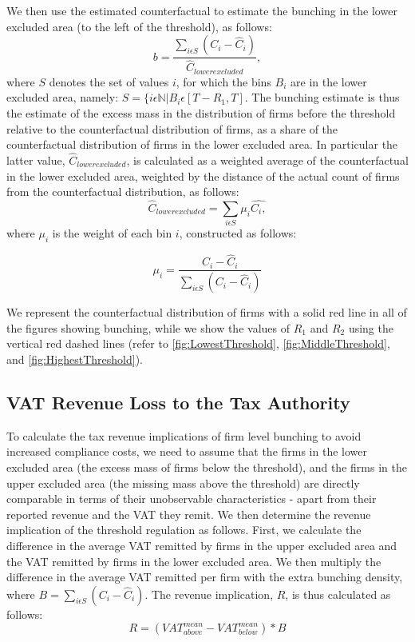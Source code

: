 We then use the estimated counterfactual to estimate the bunching in the lower excluded area (to the left of the threshold), as follows:
\begin{equation}
  \label{eq:bunching}
  b=\frac{\sum_{i\epsilon S}(C_{i}-\hat{C}_{i})}{\hat{C}_{lowerexcluded}},
\end{equation}
where $S$ denotes the set of values $i$, for which the bins $B_{i}$ are in the lower excluded area, namely: $S=\{i\epsilon\mathbb{N}|B_{i}\epsilon[T-R_{1},T]$. The bunching estimate is thus the estimate of the excess mass in the distribution of firms before the threshold relative to the counterfactual distribution of firms, as a share of the counterfactual distribution of firms in the lower excluded area. In particular the latter value, $\hat{C}_{lowerexcluded}$, is calculated as a weighted average of the counterfactual in the lower excluded area, weighted by the distance of the actual count of firms from the counterfactual distribution, as follows: 
\begin{equation}
  \label{eq:lowerexcluded}
  \hat{C}_{lowerexcluded}=\sum_{i\epsilon S}\mu_{i}\hat{C_{i},}
\end{equation}
where $\mu_{i}$ is the weight of each bin $i$, constructed as follows:

\begin{equation}
  \label{eq:weight}
  \mu_{i}=\frac{C_{i}-\hat{C}_{i}}{\sum_{i\epsilon S}(C_{i}-\hat{C}_{i})}
\end{equation}

We represent the counterfactual distribution of firms with a solid red line in all of the figures showing bunching, while we show the
values of $R_{1}$ and $R_{2}$ using the vertical red dashed lines (refer to \cref{fig:LowestThreshold}, \cref{fig:MiddleThreshold}, and \cref{fig:HighestThreshold}).

\subsection{VAT Revenue Loss to the Tax Authority}
\label{subsec:3-methodology-revenue-loss}
To calculate the tax revenue implications of firm level bunching to avoid increased compliance costs, we need to assume that the firms in the lower excluded area (the excess mass of firms below the threshold), and the firms in the upper excluded area (the missing mass above the threshold) are directly comparable in terms of their unobservable characteristics - apart from their reported revenue and the VAT they remit. We then determine the revenue implication of the threshold regulation as follows. First, we calculate the difference in the average VAT remitted by firms in the upper excluded area and the VAT remitted by firms in the lower excluded area. We then multiply the difference in the average VAT remitted per firm with the extra bunching density, where $B=\sum_{i\epsilon S}(C_{i}-\hat{C}_{i})$. The revenue implication, $R$, is thus calculated as follows:
\begin{equation}
  \label{eq:revenue-implication}
  R=(VAT_{above}^{mean}-VAT_{below}^{mean})*B
\end{equation}


